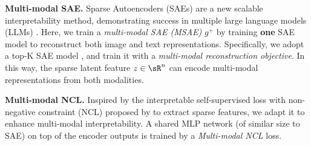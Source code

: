 \textbf{Multi-modal SAE.} Sparse Autoencoders (SAEs) \citep{cunningham2023sparse} are a new scalable interpretability method,
demonstrating success in multiple large language models (LLMs) \citep{templeton2024scaling,gao2024scaling,lieberum2024gemma}. Here, we train a \emph{multi-modal SAE (MSAE)} $g^+$ by training \textbf{one} SAE model to reconstruct both image and text representations. Specifically, we adopt a top-K SAE model \citep{makhzani2013k,gao2024scaling},
and train it with a \emph{multi-modal reconstruction objective}.
In this way, the sparse latent feature $z\in\sR^n$ can encode multi-modal representations from both modalities.

\textbf{Multi-modal NCL.} 
Inspired by the interpretable self-supervised loss with non-negative constraint (NCL) proposed by \citep{wang2024ncl} to extract sparse features, we adapt it to enhance multi-modal interpretability. 
A shared MLP network (of similar size to SAE) on top of the encoder outputs is trained by a \emph{Multi-modal NCL} loss.

